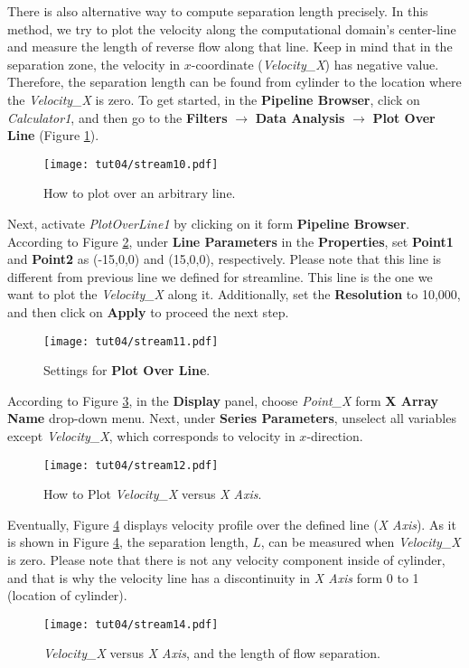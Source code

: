 There is also alternative way to compute separation length precisely. In this method, we try to plot the velocity along the computational domain's center-line and measure the length of reverse flow along that line. Keep in mind that in the separation zone, the velocity in $x$-coordinate (\textit{Velocity\_X}) has negative value. Therefore, the separation length can be found from cylinder to the location where the \textit{Velocity\_X} is zero. To get started, in the \textbf{Pipeline Browser}, click on \textit{Calculator1}, and then go to the \textbf{Filters} $\rightarrow$ \textbf{Data Analysis} $\rightarrow$ \textbf{Plot Over Line} (Figure \ref{fig4:stream10_4}).
\begin{figure}[htbp]
    \centering
    \texttt{[image: tut04/stream10.pdf]}
    \caption{How to plot over an arbitrary line.}
    \label{fig4:stream10_4}
\end{figure}
Next, activate \textit{PlotOverLine1} by clicking on it form \textbf{Pipeline Browser}. According to Figure \ref{fig4:stream11_4}, under \textbf{Line Parameters} in the \textbf{Properties}, set \textbf{Point1} and \textbf{Point2} as (-15,0,0) and (15,0,0), respectively. Please note that this line is different from previous line we defined for streamline. This line is the one we want to plot the \textit{Velocity\_X} along it. Additionally, set the \textbf{Resolution} to 10,000, and then click on \textbf{Apply} to proceed the next step.
\begin{figure}[htbp]
    \centering
    \texttt{[image: tut04/stream11.pdf]}
    \caption{Settings for \textbf{Plot Over Line}.}
    \label{fig4:stream11_4}
\end{figure}
According to Figure \ref{fig4:stream12_4}, in the \textbf{Display} panel, choose \textit{Point\_X} form \textbf{X Array Name} drop-down menu. Next, under \textbf{Series Parameters}, unselect all variables except \textit{Velocity\_X}, which corresponds to velocity in $x$-direction.
\begin{figure}[htbp]
    \centering
    \texttt{[image: tut04/stream12.pdf]}
    \caption{How to Plot \textit{Velocity\_X} versus \textit{X Axis}.}
    \label{fig4:stream12_4}
\end{figure}
Eventually, Figure \ref{fig4:stream14_4} displays velocity profile over the defined line (\textit{X Axis}). As it is shown in Figure \ref{fig4:stream14_4}, the separation length, $L$, can be measured when \textit{Velocity\_X} is zero. Please note that there is not any velocity component inside of cylinder, and that is why the velocity line has a discontinuity in \textit{X Axis} form 0 to 1 (location of cylinder).
\begin{figure}[htbp]
    \centering
    \texttt{[image: tut04/stream14.pdf]}
    \caption{\textit{Velocity\_X} versus \textit{X Axis}, and the length of flow separation.}
    \label{fig4:stream14_4}
\end{figure}
